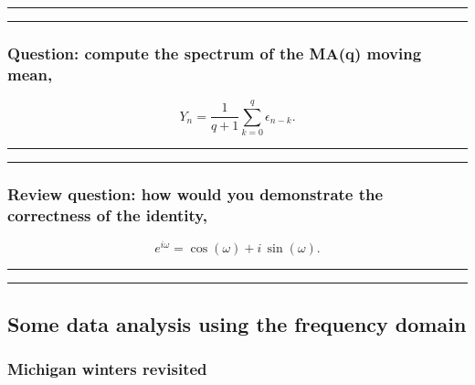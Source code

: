 \documentclass[]{article}
\begin{document}
\begin{center}\rule{0.5\linewidth}{\linethickness}\end{center}

\begin{center}\rule{0.5\linewidth}{\linethickness}\end{center}

\subsubsection{Question: compute the spectrum of the MA(q) moving
mean,}\label{question-compute-the-spectrum-of-the-maq-moving-mean}

\[ Y_n = \frac{1}{q+1} \sum_{k=0}^q \epsilon_{n-k}.\]

\begin{center}\rule{0.5\linewidth}{\linethickness}\end{center}

\begin{center}\rule{0.5\linewidth}{\linethickness}\end{center}

\subsubsection{Review question: how would you demonstrate the
correctness of the
identity,}\label{review-question-how-would-you-demonstrate-the-correctness-of-the-identity}

\[ e^{i\omega} = \cos(\omega)+i\,\sin(\omega).\]


\begin{center}\rule{0.5\linewidth}{\linethickness}\end{center}

\begin{center}\rule{0.5\linewidth}{\linethickness}\end{center}

\subsection{Some data analysis using the frequency
domain}\label{some-data-analysis-using-the-frequency-domain}

\subsubsection{Michigan winters
revisited}\label{michigan-winters-revisited}
\end{document}
